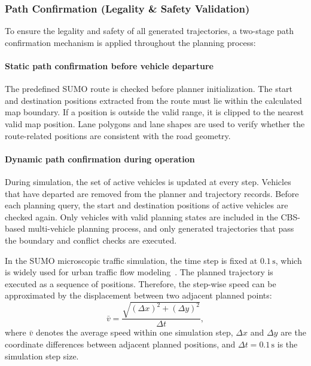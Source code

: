 \documentclass[journal]{IEEEtran}
\begin{document}
\subsubsection{Path Confirmation (Legality \& Safety Validation)}

To ensure the legality and safety of all generated trajectories, a two-stage path confirmation mechanism is applied throughout the planning process:

\paragraph{Static path confirmation before vehicle departure}
The predefined SUMO route is checked before planner initialization. The start and destination positions extracted from the route must lie within the calculated map boundary. If a position is outside the valid range, it is clipped to the nearest valid map position. Lane polygons and lane shapes are used to verify whether the route-related positions are consistent with the road geometry.

\paragraph{Dynamic path confirmation during operation}
During simulation, the set of active vehicles is updated at every step. Vehicles that have departed are removed from the planner and trajectory records. Before each planning query, the start and destination positions of active vehicles are checked again. Only vehicles with valid planning states are included in the CBS-based multi-vehicle planning process, and only generated trajectories that pass the boundary and conflict checks are executed.

In the SUMO microscopic traffic simulation, the time step is fixed at $0.1\,\text{s}$, which is widely used for urban traffic flow modeling~\cite{behrisch2011}. The planned trajectory is executed as a sequence of positions. Therefore, the step-wise speed can be approximated by the displacement between two adjacent planned points:
\begin{equation}
\bar{v}
=
\frac{\sqrt{(\Delta x)^2+(\Delta y)^2}}{\Delta t},
\label{eq_speed_calc}
\end{equation}
where $\bar{v}$ denotes the average speed within one simulation step, $\Delta x$ and $\Delta y$ are the coordinate differences between adjacent planned positions, and $\Delta t=0.1\,\text{s}$ is the simulation step size.
\end{document}
